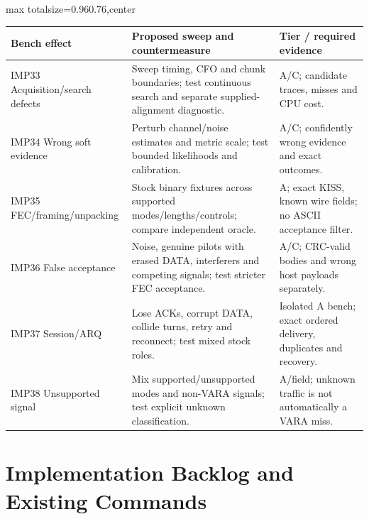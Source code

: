 \documentclass[11pt,a4paper]{article}
\newlength{\tableavail}
\renewcommand{\arraystretch}{1.13}
\begin{document}
\begin{landscape}\thispagestyle{plain}\centering
\setlength{\tabcolsep}{5pt}\renewcommand{\arraystretch}{1.25}
\setlength{\tableavail}{\dimexpr\linewidth-4\tabcolsep\relax}
\begin{adjustbox}{max totalsize={0.96\linewidth}{0.76\textheight},center}
\begin{tabular}{@{}>{\raggedright\arraybackslash}p{0.23\tableavail}>{\raggedright\arraybackslash}p{0.54\tableavail}>{\raggedright\arraybackslash}p{0.23\tableavail}@{}}
\toprule
\textbf{Bench effect} & \textbf{Proposed sweep and countermeasure} & \textbf{Tier / required evidence}\\
\midrule
IMP33 Acquisition/search defects & Sweep timing, CFO and chunk boundaries; test continuous search and separate supplied-alignment diagnostic. & A/C; candidate traces, misses and CPU cost.\\[5pt]
IMP34 Wrong soft evidence & Perturb channel/noise estimates and metric scale; test bounded likelihoods and calibration. & A/C; confidently wrong evidence and exact outcomes.\\[5pt]
IMP35 FEC/framing/unpacking & Stock binary fixtures across supported modes/lengths/controls; compare independent oracle. & A; exact KISS, known wire fields; no ASCII acceptance filter.\\[5pt]
IMP36 False acceptance & Noise, genuine pilots with erased DATA, interferers and competing signals; test stricter FEC acceptance. & A/C; CRC-valid bodies and wrong host payloads separately.\\[5pt]
IMP37 Session/ARQ & Lose ACKs, corrupt DATA, collide turns, retry and reconnect; test mixed stock roles. & Isolated A bench; exact ordered delivery, duplicates and recovery.\\[5pt]
IMP38 Unsupported signal & Mix supported/unsupported modes and non-VARA signals; test explicit unknown classification. & A/field; unknown traffic is not automatically a VARA miss.\\[5pt]
\bottomrule
\end{tabular}
\end{adjustbox}
\end{landscape}

\section{Implementation Backlog and Existing Commands}
\label{tp:backlog}
\end{document}
